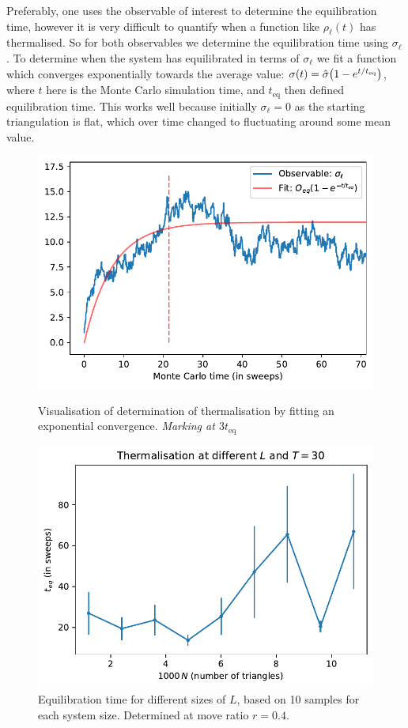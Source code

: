 Preferably, one uses the observable of interest to determine the equilibration time, however it is very difficult to quantify when a function like $\rho_\ell(t)$ has thermalised. So for both observables we determine the equilibration time using $\sigma_\ell$.
To determine when the system has equilibrated in terms of $\sigma_\ell$ we fit a function which converges exponentially towards the average value:
$\sigma(t) = \hat\sigma \qty(1 - e^{t/t_\text{eq}})$, where $t$ here is the Monte Carlo simulation time, and $t_\text{eq}$ then defined equilibration time.
This works well because initially $\sigma_\ell = 0$ as the starting triangulation is flat, which over time changed to fluctuating around some mean value.
\begin{figure}[ht]
    \centering
    \begin{minipage}[t]{0.47\linewidth}
        \centering
        \includegraphics[width=0.95\linewidth]{img/teq_thermalisation.pdf}
        \caption{Visualisation of determination of thermalisation by fitting an exponential convergence. \textit{Marking at $3t_\text{eq}$}}
        \label{fig:thermalisation}
    \end{minipage}
    \hfill
    \begin{minipage}[t]{0.48\linewidth}
        \centering
        \includegraphics[width=0.95\linewidth]{img/teq-Ldep.pdf}
        \caption{Equilibration time for different sizes of $L$, based on 10 samples for each system size. Determined at move ratio $r=0.4$.}
        \label{fig:teq_Ldep}
    \end{minipage}
\end{figure}
